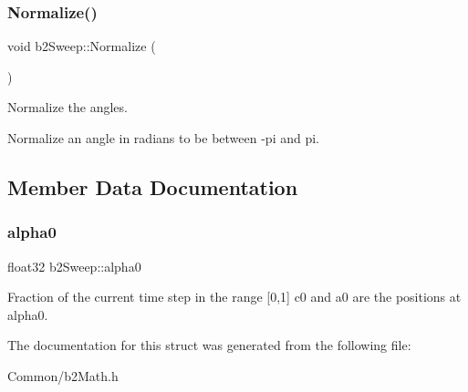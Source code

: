 \subsubsection{\texorpdfstring{Normalize()}{Normalize()}}
{\footnotesize\ttfamily void b2\+Sweep\+::\+Normalize (\begin{DoxyParamCaption}{ }\end{DoxyParamCaption})\hspace{0.3cm}{\ttfamily [inline]}}



Normalize the angles. 

Normalize an angle in radians to be between -\/pi and pi. 

\subsection{Member Data Documentation}
\mbox{\label{structb2Sweep_aa5f8ab90178b58bc0777096cbc6b91cf}} 
\subsubsection{\texorpdfstring{alpha0}{alpha0}}
{\footnotesize\ttfamily float32 b2\+Sweep\+::alpha0}

Fraction of the current time step in the range \mbox{[}0,1\mbox{]} c0 and a0 are the positions at alpha0. 

The documentation for this struct was generated from the following file\+:\begin{DoxyCompactItemize}
\item 
Common/b2\+Math.\+h\end{DoxyCompactItemize}
